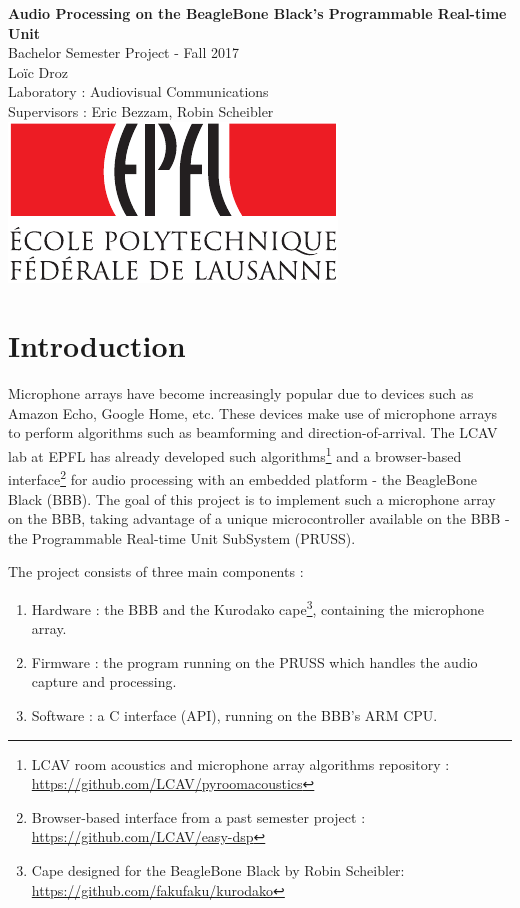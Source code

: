 \documentclass[]{report}
\providecommand{\tightlist}{%
	\setlength{\itemsep}{0pt}\setlength{\parskip}{0pt}}
\begin{document}
\begin{titlepage}
	\centering
	\vspace*{50px}
	\vfill
	{
		\textbf{\LARGE Audio Processing on the BeagleBone Black's Programmable Real-time Unit}\\
		\vskip0.5cm
		{\LARGE Bachelor Semester Project - Fall 2017} \\
		\vskip2cm
		{\Large Loïc Droz}\\
		\vskip2cm
		{\normalsize Laboratory : Audiovisual Communications}\\
		{\normalsize Supervisors : Eric Bezzam, Robin Scheibler}
	}    
	\vfill
	\vskip5cm
	\includegraphics[width=0.5\linewidth]{Pictures/epfl}
\end{titlepage}


\tableofcontents


\hypertarget{introduction-motivation}{%
\chapter{Introduction}\label{introduction-motivation}}

Microphone arrays have become increasingly popular due to devices such as Amazon Echo, Google Home, etc. These devices make use of microphone arrays to perform algorithms such as beamforming and direction-of-arrival. The LCAV lab at EPFL has already developed such algorithms\footnote{LCAV room acoustics and microphone array algorithms repository : \url{https://github.com/LCAV/pyroomacoustics}} and a browser-based interface\footnote{Browser-based interface from a past semester project : \url{https://github.com/LCAV/easy-dsp}} for audio processing with an embedded platform - the BeagleBone Black (BBB). The goal of this project is to implement such a microphone array on the BBB, taking advantage of a unique microcontroller available on the BBB - the Programmable Real-time Unit SubSystem (PRUSS).

The project consists of three main components :

\begin{enumerate}
  \tightlist
  \item Hardware : the BBB and the Kurodako cape\footnote{Cape designed for the BeagleBone Black by Robin Scheibler: \url{https://github.com/fakufaku/kurodako}}, containing the microphone array.
  \item Firmware : the program running on the PRUSS which handles the audio capture and processing.
  \item Software : a C interface (API), running on the BBB's ARM CPU.
\end{enumerate}
\end{document}
